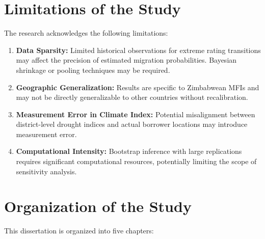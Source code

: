 \documentclass[12pt,a4paper]{article}
\begin{document}
\section{Limitations of the Study}

The research acknowledges the following limitations:

\begin{enumerate}[noitemsep]
    \item \textbf{Data Sparsity:} Limited historical observations for extreme rating transitions may affect the precision of estimated migration probabilities. Bayesian shrinkage or pooling techniques may be required.
    
    \item \textbf{Geographic Generalization:} Results are specific to Zimbabwean MFIs and may not be directly generalizable to other countries without recalibration.
    
    \item \textbf{Measurement Error in Climate Index:} Potential misalignment between district-level drought indices and actual borrower locations may introduce measurement error.
    
    
    \item \textbf{Computational Intensity:} Bootstrap inference with large replications requires significant computational resources, potentially limiting the scope of sensitivity analysis.
    
\end{enumerate}

\section{Organization of the Study}

This dissertation is organized into five chapters:
\end{document}

